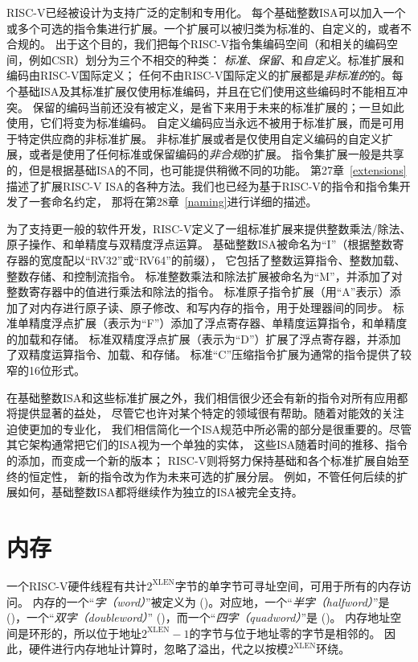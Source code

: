 RISC-V已经被设计为支持广泛的定制和专用化。
每个基础整数ISA可以加入一个或多个可选的指令集进行扩展。一个扩展可以被归类为标准的、自定义的，或者不合规的。
出于这个目的，我们把每个RISC-V指令集编码空间（和相关的编码空间，例如CSR）划分为三个不相交的种类：
{\em 标准}、{\em 保留}、和{\em 自定义}。标准扩展和编码由RISC-V国际定义；
任何不由RISC-V国际定义的扩展都是{\em 非标准的}的。每个基础ISA及其标准扩展仅使用标准编码，并且在它们使用这些编码时不能相互冲突。
保留的编码当前还没有被定义，是省下来用于未来的标准扩展的；一旦如此使用，它们将变为标准编码。
自定义编码应当永远不被用于标准扩展，而是可用于特定供应商的非标准扩展。
非标准扩展或者是仅使用自定义编码的自定义扩展，或者是使用了任何标准或保留编码的{\em 非合规}的扩展。
指令集扩展一般是共享的，但是根据基础ISA的不同，也可能提供稍微不同的功能。
第27章~\ref{extensions}描述了扩展RISC-V ISA的各种方法。我们也已经为基于RISC-V的指令和指令集开发了一套命名约定，
那将在第28章~\ref{naming}进行详细的描述。


为了支持更一般的软件开发，RISC-V定义了一组标准扩展来提供整数乘法/除法、原子操作、和单精度与双精度浮点运算。
基础整数ISA被命名为“I”（根据整数寄存器的宽度配以“RV32”或“RV64”的前缀），
它包括了整数运算指令、整数加载、整数存储、和控制流指令。
标准整数乘法和除法扩展被命名为“M”，并添加了对整数寄存器中的值进行乘法和除法的指令。
标准原子指令扩展（用“A”表示）添加了对内存进行原子读、原子修改、和写内存的指令，用于处理器间的同步。
标准单精度浮点扩展（表示为“F”）添加了浮点寄存器、单精度运算指令，和单精度的加载和存储。
标准双精度浮点扩展（表示为“D”）扩展了浮点寄存器，并添加了双精度运算指令、加载、和存储。
标准“C”压缩指令扩展为通常的指令提供了较窄的16位形式。

在基础整数ISA和这些标准扩展之外，我们相信很少还会有新的指令对所有应用都将提供显著的益处，
尽管它也许对某个特定的领域很有帮助。随着对能效的关注迫使更加的专业化，
我们相信简化一个ISA规范中所必需的部分是很重要的。尽管其它架构通常把它们的ISA视为一个单独的实体，
这些ISA随着时间的推移、指令的添加，而变成一个新的版本；
RISC-V则将努力保持基础和各个标准扩展自始至终的恒定性，
新的指令改为作为未来可选的扩展分层。
例如，不管任何后续的扩展如何，基础整数ISA都将继续作为独立的ISA被完全支持。

\section{内存}

一个RISC-V硬件线程有共计$2^{\text{XLEN}}$字节的单字节可寻址空间，可用于所有的内存访问。
内存的一个“{\em 字（word）}”被定义为
()。对应地，一个“{\em 半字（halfword）}”是
()，一个“{\em 双字（doubleword）}”
()，而一个“{\em 四字（quadword）}”是
()。
内存地址空间是环形的，所以位于地址$2^{\text{XLEN}}-1$的字节与位于地址零的字节是相邻的。
因此，硬件进行内存地址计算时，忽略了溢出，代之以按模$2^{\text{XLEN}}$环绕。

